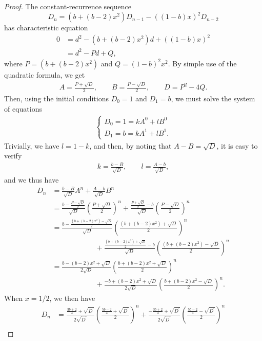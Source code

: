 \documentclass[11pt, letterpaper]{article}
\begin{document}
\begin{proof}
The constant-recurrence sequence
$$ D_n= \left(b + (b-2)x^2\right) D_{n-1} - \left((1-b)x\right)^2 D_{n-2}$$
has characteristic equation 
\begin{align*}
0 &= d^2 - \left(b + (b-2)x^2\right) d + \left((1-b)x\right)^2\\
&= d^2 - P d + Q, 
\end{align*}
where $P = \left(b + (b-2)x^2 \right)$ and $Q = (1-b)^2x^2$. By simple use of the quadratic formula, we get 
\begin{align*}
A = \frac{P+\sqrt{D}}{2}, \qquad B = \frac{P - \sqrt{D}}{2}, \qquad D = P^2 - 4Q.
\end{align*}
Then, using the initial conditions $D_0 = 1$ and $D_1 = b$, we must solve the system of equations 
\begin{align*}
\begin{cases}
D_0 = 1 = k A^0 + l B^0 \\
D_1 = b =  k A^1 + l B^1.
\end{cases}
\end{align*}
Trivially, we have $l = 1-k$, and then, by noting that $A-B = \sqrt{D}$, it is easy to verify 
\begin{align*}
k = \frac{b - B}{\sqrt{D}}, \qquad
l = \frac{A - b}{\sqrt{D}},
\end{align*}
and we thus have
\begin{align*}
D_n &= \frac{b - B}{\sqrt{D}}A^n + \frac{A - b}{\sqrt{D}}B^n \\
&= \frac{b - \frac{P - \sqrt{D}}{2}}{\sqrt{D}}\left(\frac{P+\sqrt{D}}{2}\right)^n + \frac{\frac{P+\sqrt{D}}{2} - b}{\sqrt{D}}\left(\frac{P - \sqrt{D}}{2}\right)^n \\
&= \frac{b - \frac{\left(b + (b-2)x^2 \right) - \sqrt{D}}{2}}{\sqrt{D}}\left(\frac{\left(b + (b-2)x^2 \right)+\sqrt{D}}{2}\right)^n  \\
&\qquad\qquad\qquad + \frac{\frac{\left(b + (b-2)x^2 \right)+\sqrt{D}}{2} - b}{\sqrt{D}}\left(\frac{\left(b + (b-2)x^2 \right) - \sqrt{D}}{2}\right)^n \\
&= \frac{b - (b-2)x^2 + \sqrt{D}}{2\sqrt{D}}\left(\frac{b + (b-2)x^2 +\sqrt{D}}{2}\right)^n  \\
&\qquad\qquad\qquad + \frac{-b + (b-2)x^2 +\sqrt{D}}{2\sqrt{D}}\left(\frac{b + (b-2)x^2 - \sqrt{D}}{2}\right)^n.
\end{align*}
When $x=1/2$, we then have 
\begin{align*}
D_n &=\frac{\frac{3b + 2}{4}+ \sqrt{D^\prime}}{2\sqrt{D^\prime}}\left(\frac{\frac{5b - 2}{4} +\sqrt{D^\prime}}{2}\right)^n +  \frac{-\frac{3b + 2}{4} +\sqrt{D^\prime}}{2\sqrt{D^\prime}}\left(\frac{\frac{5b - 2}{4}  - \sqrt{D^\prime}}{2}\right)^n \\

\end{align*}
\end{proof}
\end{document}
